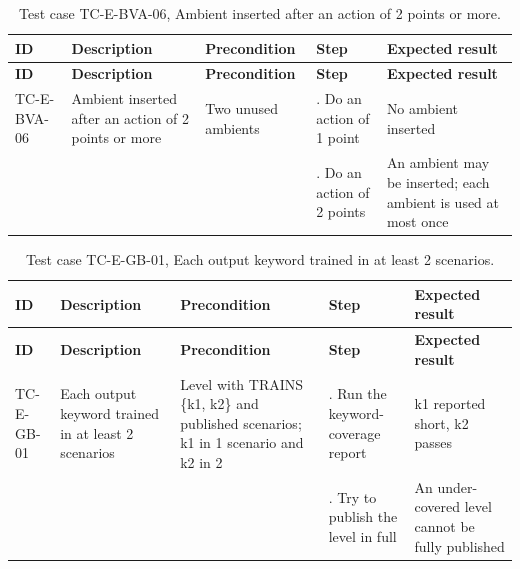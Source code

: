 {\small
\begin{longtable}{|>{\raggedright\arraybackslash}p{}|>{\raggedright\arraybackslash}p{}|>{\raggedright\arraybackslash}p{}|>{\raggedright\arraybackslash}p{}|>{\raggedright\arraybackslash}p{}|}
\caption{Test case TC-E-BVA-06, Ambient inserted after an action of 2 points or more.} \\
\hline
\textbf{ID} & \textbf{Description} & \textbf{Precondition} & \textbf{Step} & \textbf{Expected result} \\ \hline
\endfirsthead
\hline
\textbf{ID} & \textbf{Description} & \textbf{Precondition} & \textbf{Step} & \textbf{Expected result} \\ \hline
\endhead
TC-E-BVA-06 & Ambient inserted after an action of 2 points or more & Two unused ambients & 1. Do an action of 1 point & No ambient inserted \\ \hline
 &  &  & 2. Do an action of 2 points & An ambient may be inserted; each ambient is used at most once \\ \hline
\end{longtable}
}

{\small
\begin{longtable}{|>{\raggedright\arraybackslash}p{}|>{\raggedright\arraybackslash}p{}|>{\raggedright\arraybackslash}p{}|>{\raggedright\arraybackslash}p{}|>{\raggedright\arraybackslash}p{}|}
\caption{Test case TC-E-GB-01, Each output keyword trained in at least 2 scenarios.} \\
\hline
\textbf{ID} & \textbf{Description} & \textbf{Precondition} & \textbf{Step} & \textbf{Expected result} \\ \hline
\endfirsthead
\hline
\textbf{ID} & \textbf{Description} & \textbf{Precondition} & \textbf{Step} & \textbf{Expected result} \\ \hline
\endhead
TC-E-GB-01 & Each output keyword trained in at least 2 scenarios & Level with TRAINS \{k1, k2\} and published scenarios; k1 in 1 scenario and k2 in 2 & 1. Run the keyword-coverage report & k1 reported short, k2 passes \\ \hline
 &  &  & 2. Try to publish the level in full & An under-covered level cannot be fully published \\ \hline
\end{longtable}
}

